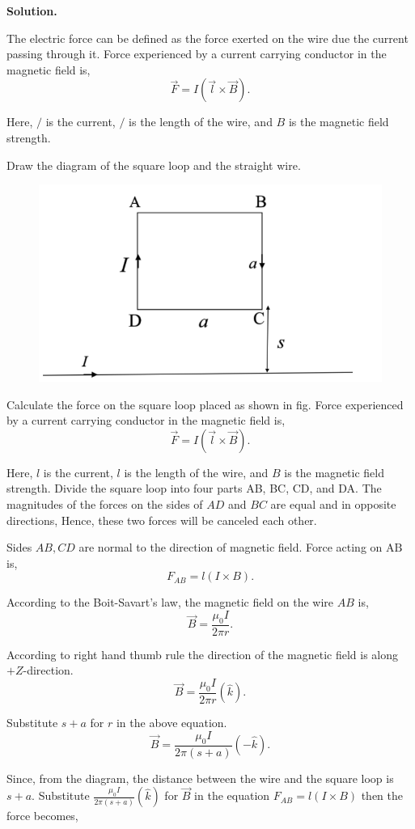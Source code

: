 \documentclass[12pt, a4paper, oneside]{report}
\newenvironment{solution}{
  \par\medskip\noindent
  \textbf{Solution.}\quad\itshape
  \par\noindent\makebox[\linewidth]{\rule{\textwidth}{0.4pt}}
}{
  \par\noindent\makebox[\linewidth]{\rule{\textwidth}{0.4pt}}
  \par\medskip
}
\begin{document}
\begin{solution}
The electric force can be defined as the force exerted on the wire due the current passing through it.
Force experienced by a current carrying conductor in the magnetic field is,
$$
\vec{F}=I(\vec{l} \times \vec{B}).
$$

Here, $/$ is the current, $/$ is the length of the wire, and $B$ is the magnetic field strength.

Draw the diagram of the square loop and the straight wire.


\begin{figure}[ht!]
    \centering
    \includegraphics[width=0.5\linewidth]{7.png}
    \caption{}
    \label{fig:enter-label}
\end{figure}
Calculate the force on the square loop placed as shown in fig.
Force experienced by a current carrying conductor in the magnetic field is,
$$
\vec{F}=I(\vec{l} \times \vec{B}).
$$

Here, $l$ is the current, $l$ is the length of the wire, and $B$ is the magnetic field strength.
Divide the square loop into four parts AB, BC, CD, and DA.
The magnitudes of the forces on the sides of $A D$ and $B C$ are equal and in opposite directions, Hence, these two forces will be canceled each other.

Sides $A B, C D$ are normal to the direction of magnetic field.
Force acting on $\mathrm{AB}$ is,
$$
F_{A B}=l(I \times B).
$$

According to the Boit-Savart's law, the magnetic field on the wire $A B$ is,
$$
\vec{B}=\frac{\mu_0 I}{2 \pi r}.
$$

According to right hand thumb rule the direction of the magnetic field is along $+Z$-direction.
$$
\vec{B}=\frac{\mu_0 I}{2 \pi r}(\hat{k}).
$$

Substitute $s+a$ for $r$ in the above equation.
$$
\vec{B}=\frac{\mu_0 I}{2 \pi(s+a)}(-\hat{k}).
$$

Since, from the diagram, the distance between the wire and the square loop is $s+a$.
Substitute $\frac{\mu_0 I}{2 \pi(s+a)}(\hat{k})$ for $\vec{B}$ in the equation $F_{A B}=l(I \times B)$ then the force becomes,


\end{solution}
\end{document}
